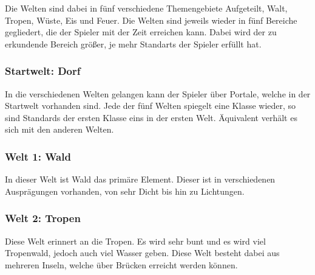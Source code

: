 Die Welten sind dabei in fünf verschiedene Themengebiete Aufgeteilt, Walt, Tropen, Wüste, Eis und Feuer.
Die Welten sind jeweils wieder in fünf Bereiche gegliedert, die der Spieler mit der Zeit erreichen kann. Dabei wird der zu erkundende Bereich größer, je mehr Standarts der Spieler erfüllt hat. %




\subsubsection{Startwelt: Dorf}
	In die verschiedenen Welten gelangen kann der Spieler über Portale, welche in der Startwelt vorhanden sind.
	Jede der fünf Welten spiegelt eine Klasse wieder, so sind Standards der ersten Klasse eins in der ersten Welt. Äquivalent verhält es sich mit den anderen Welten.
	
\subsubsection{Welt 1: Wald}
	In dieser Welt ist Wald das primäre Element. Dieser ist in verschiedenen Ausprägungen vorhanden, von sehr Dicht bis hin zu Lichtungen.
	
\subsubsection{Welt 2: Tropen}
	Diese Welt erinnert an die Tropen. Es wird sehr bunt und es wird viel Tropenwald, jedoch auch viel Wasser geben. Diese Welt besteht dabei aus mehreren Inseln, welche über Brücken erreicht werden können.
	
